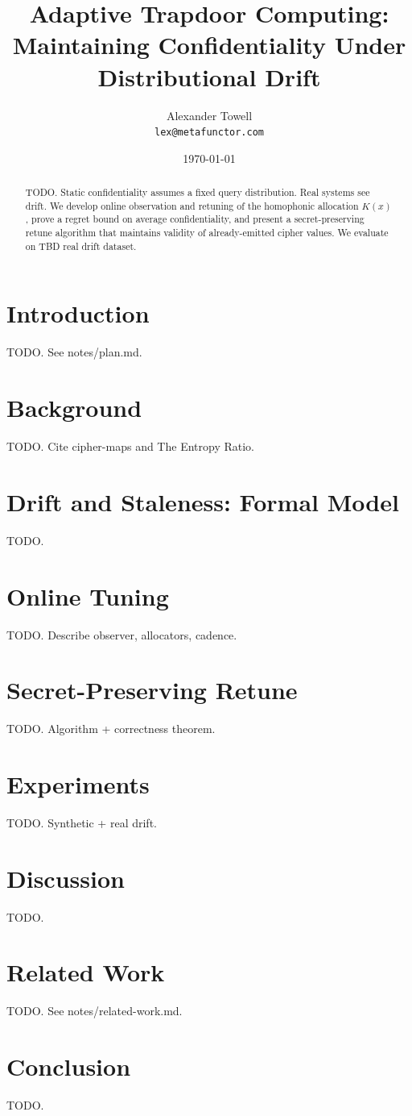 \documentclass[11pt]{article}
\title{Adaptive Trapdoor Computing:\\
Maintaining Confidentiality Under Distributional Drift}
\author{Alexander Towell\\\texttt{lex@metafunctor.com}}
\date{\today}
\theoremstyle{definition}
\theoremstyle{plain}
\theoremstyle{remark}
\begin{document}
\maketitle

\begin{abstract}
TODO. Static confidentiality assumes a fixed query distribution.
Real systems see drift. We develop online observation and retuning
of the homophonic allocation $K(x)$, prove a regret bound on average
confidentiality, and present a secret-preserving retune algorithm
that maintains validity of already-emitted cipher values. We
evaluate on TBD real drift dataset.
\end{abstract}

\section{Introduction}
TODO. See notes/plan.md.

\section{Background}
TODO. Cite cipher-maps and The Entropy Ratio.

\section{Drift and Staleness: Formal Model}
TODO.

\section{Online Tuning}
TODO. Describe observer, allocators, cadence.

\section{Secret-Preserving Retune}
TODO. Algorithm + correctness theorem.

\section{Experiments}
TODO. Synthetic + real drift.

\section{Discussion}
TODO.

\section{Related Work}
TODO. See notes/related-work.md.

\section{Conclusion}
TODO.



\end{document}
